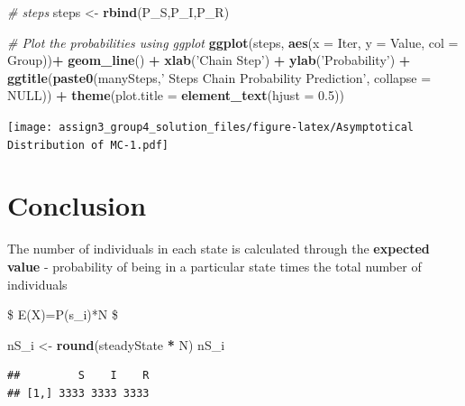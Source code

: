 \documentclass[
]{article}
\newenvironment{Shaded}{\begin{snugshade}}{\end{snugshade}}
\newcommand{\CommentTok}[1]{\textcolor[rgb]{0.56,0.35,0.01}{\textit{#1}}}
\newcommand{\DataTypeTok}[1]{\textcolor[rgb]{0.13,0.29,0.53}{#1}}
\newcommand{\FloatTok}[1]{\textcolor[rgb]{0.00,0.00,0.81}{#1}}
\newcommand{\KeywordTok}[1]{\textcolor[rgb]{0.13,0.29,0.53}{\textbf{#1}}}
\newcommand{\NormalTok}[1]{#1}
\newcommand{\OperatorTok}[1]{\textcolor[rgb]{0.81,0.36,0.00}{\textbf{#1}}}
\newcommand{\OtherTok}[1]{\textcolor[rgb]{0.56,0.35,0.01}{#1}}
\newcommand{\StringTok}[1]{\textcolor[rgb]{0.31,0.60,0.02}{#1}}
\begin{document}
\begin{Shaded}
\begin{Highlighting}[]
\CommentTok{# steps}
\NormalTok{steps <-}\StringTok{ }\KeywordTok{rbind}\NormalTok{(P_S,P_I,P_R)}

\CommentTok{# Plot the probabilities using ggplot}
\KeywordTok{ggplot}\NormalTok{(steps, }\KeywordTok{aes}\NormalTok{(}\DataTypeTok{x =}\NormalTok{ Iter, }\DataTypeTok{y =}\NormalTok{ Value, }\DataTypeTok{col =}\NormalTok{ Group))}\OperatorTok{+}
\StringTok{  }\KeywordTok{geom_line}\NormalTok{() }\OperatorTok{+}
\StringTok{  }\KeywordTok{xlab}\NormalTok{(}\StringTok{'Chain Step'}\NormalTok{) }\OperatorTok{+}
\StringTok{  }\KeywordTok{ylab}\NormalTok{(}\StringTok{'Probability'}\NormalTok{) }\OperatorTok{+}
\StringTok{  }\KeywordTok{ggtitle}\NormalTok{(}\KeywordTok{paste0}\NormalTok{(manySteps,}\StringTok{' Steps Chain Probability Prediction'}\NormalTok{, }\DataTypeTok{collapse =} \OtherTok{NULL}\NormalTok{)) }\OperatorTok{+}\StringTok{ }
\StringTok{  }\KeywordTok{theme}\NormalTok{(}\DataTypeTok{plot.title =} \KeywordTok{element_text}\NormalTok{(}\DataTypeTok{hjust =} \FloatTok{0.5}\NormalTok{))}
\end{Highlighting}
\end{Shaded}

\texttt{[image: assign3\_group4\_solution\_files/figure-latex/Asymptotical Distribution of MC-1.pdf]}

\hypertarget{conclusion}{%
\section{Conclusion}\label{conclusion}}

The number of individuals in each state is calculated through the
\textbf{expected value} - probability of being in a particular state
times the total number of individuals

\$ E(X)=P(s\_i)*N \$

\begin{Shaded}
\begin{Highlighting}[]
\NormalTok{nS_i <-}\StringTok{ }\KeywordTok{round}\NormalTok{(steadyState }\OperatorTok{*}\StringTok{ }\NormalTok{N)}
\NormalTok{nS_i}
\end{Highlighting}
\end{Shaded}

\begin{verbatim}
##         S    I    R
## [1,] 3333 3333 3333
\end{verbatim}
\end{document}
